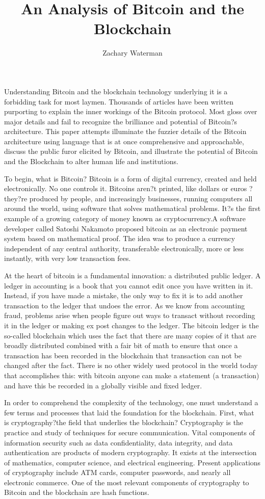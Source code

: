 \documentclass[11pt, oneside]{article}   	%
\title{An Analysis of Bitcoin and the Blockchain}
\author{Zachary Waterman}
\begin{document}
\maketitle
	Understanding Bitcoin and the blockchain technology underlying it is a forbidding task for most laymen. Thousands of articles have been written purporting to explain the inner workings of the Bitcoin protocol. Most gloss over major details and fail to recognize the brilliance and potential of Bitcoin?s architecture. This paper attempts illuminate the fuzzier details of the Bitcoin architecture using language that is at once comprehensive and approachable, discuss the public furor elicited by Bitcoin, and illustrate the potential of Bitcoin and the Blockchain to alter human life and institutions. 
	\par
	To begin, what is Bitcoin? Bitcoin is a form of digital currency, created and held electronically. No one controls it. Bitcoins aren?t printed, like dollars or euros ? they?re produced by people, and increasingly businesses, running computers all around the world, using software that solves mathematical problems. It?s the first example of a growing category of money known as cryptocurrency.A software developer called Satoshi Nakamoto proposed bitcoin as an electronic payment system based on mathematical proof. The idea was to produce a currency independent of any central authority, transferable electronically, more or less instantly, with very low transaction fees.
	\par
	At the heart of bitcoin is a fundamental innovation: a distributed public ledger. A ledger in accounting is a book that you cannot edit once you have written in it. Instead, if you have made a mistake, the only way to fix it is to add another transaction to the ledger that undoes the error. As we know from accounting fraud, problems arise when people figure out ways to transact without recording it in the ledger or making ex post changes to the ledger. The bitcoin ledger is the so-called blockchain which uses the fact that there are many copies of it that are broadly distributed combined with a fair bit of math to ensure that once a transaction has been recorded in the blockchain that transaction can not be changed after the fact. There is no other widely used protocol in the world today that accomplishes this: with bitcoin anyone can make a statement (a transaction) and have this be recorded in a globally visible and fixed ledger.
	\par
	In order to comprehend the complexity of the technology, one must understand a few terms and processes that laid the foundation for the blockchain. First, what is cryptography?the field that underlies the blockchain? Cryptography is the practice and study of techniques for secure communication. Vital components of information security such as data confidentiality, data integrity, and data authentication are products of modern cryptography. It exists at the intersection of mathematics, computer science, and electrical engineering. Present applications of cryptography include ATM cards, computer passwords, and nearly all electronic commerce. One of the most relevant components of cryptography to Bitcoin and the blockchain are hash functions. 
\end{document}
